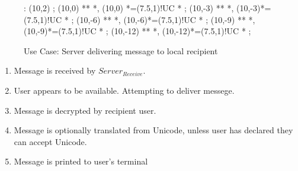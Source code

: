 \begin{figure}[hbt]

\xy<1cm,0cm>:
(10,2) ; (10,0) **\dir{=} *\dir{>},
(10,0) *=(7.5,1)!UC *\frm{-} ;
(10,-3) **\dir{-} *\dir{>},
(10,-3)*=(7.5,1)!UC *\frm{-} ; 
(10,-6) **\dir{-} *\dir{>},
(10,-6)*=(7.5,1)!UC *\frm{-} ; 
(10,-9) **\dir{-} *\dir{>},
(10,-9)*=(7.5,1)!UC *\frm{=} ; 
(10,-12) **\dir{-} *\dir{>},
(10,-12)*=(7.5,1)!UC *\frm{-} ; 
\endxy

\caption{Use Case: Server delivering message to local recipient}

\end{figure}

\begin{enumerate}

\item Message is received by $Server_{Receive}$.

\item User appears to be available. Attempting to deliver messege.

\item Message is decrypted by recipient user. 

\item Message is optionally translated from Unicode, unless user has
declared they can accept Unicode. 

\item Message is printed to user's terminal

\end{enumerate}
